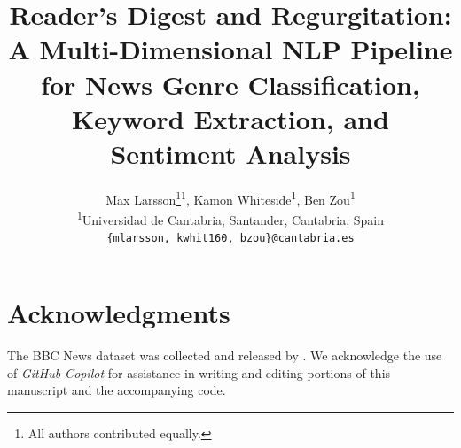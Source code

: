 \documentclass[10pt,twocolumn,letterpaper]{article}
\title{Reader's Digest and Regurgitation: A Multi-Dimensional NLP Pipeline for News Genre Classification,
       Keyword Extraction, and Sentiment Analysis}
\author{%
Max Larsson\thanks{All authors contributed equally.}\textsuperscript{1},\;
Kamon Whiteside\footnotemark[1]\textsuperscript{1},\;
Ben Zou\footnotemark[1]\textsuperscript{1}\\[4pt]
{\small
\textsuperscript{1}Universidad de Cantabria, Santander, Cantabria, Spain}\\
{\tt\small \{mlarsson, kwhit160, bzou\}@cantabria.es}
}
\begin{document}
\maketitle









\section*{Acknowledgments}
The BBC News dataset was collected and released by \citet{greene2006practical}.
We acknowledge the use of \textit{GitHub Copilot} for assistance in writing and
editing portions of this manuscript and the accompanying code.

{
    \small
    
    
}
\end{document}
